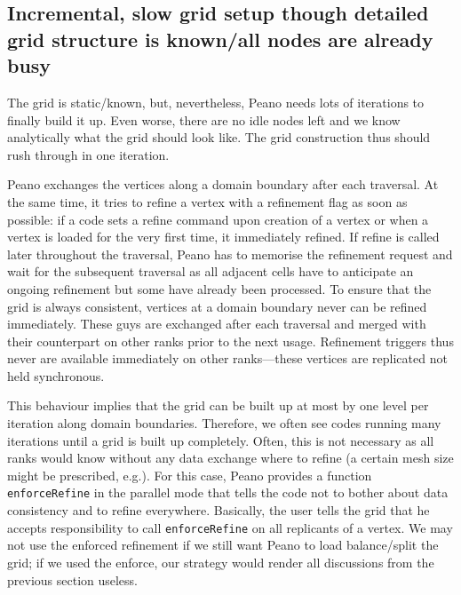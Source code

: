 \subsection{Incremental, slow grid setup though detailed grid structure is
known/all nodes are already busy}
\label{subsection:mpi-setup:slow-incremental-setup}


\begin{smell}
The grid is static/known, but, nevertheless, Peano
needs lots of iterations to finally build it up. Even worse, there are no idle nodes left and we know analytically
what the grid should look like.
The grid construction thus should rush through in one iteration.
\end{smell}


\noindent
Peano exchanges the vertices along a domain boundary after each traversal.
At the same time, it tries to refine a vertex with a refinement flag as soon as
possible: 
if a code sets a refine command upon creation of a vertex or when a vertex is
loaded for the very first time, it immediately refined.
If refine is called later throughout the traversal, Peano has to memorise the 
refinement request and wait for the subsequent traversal as all adjacent cells
have to anticipate an ongoing refinement but some have already been processed.
To ensure that the grid is always consistent, vertices at a domain boundary
never can be refined immediately. 
These guys are exchanged after each traversal and merged with their counterpart
on other ranks prior to the next usage. 
Refinement triggers thus never are available immediately on other ranks---these
vertices are replicated not held synchronous.

This behaviour implies that the grid can be built up at most by one level per
iteration along domain boundaries.
Therefore, we often see codes running many iterations until a  grid is
built up completely.
Often, this is not necessary as all ranks would know without any data
exchange where to refine (a certain mesh size might be prescribed, e.g.).
For this case, Peano provides a function \texttt{enforceRefine} in the parallel
mode that tells the code not to bother about data consistency and to refine 
everywhere. 
Basically, the user tells the grid that he accepts responsibility to call 
\texttt{enforceRefine} on all replicants of a vertex.
We may not use the enforced refinement if we still want Peano to load
balance/split the grid; if we used the enforce, our strategy would render all
discussions from the previous section useless.


